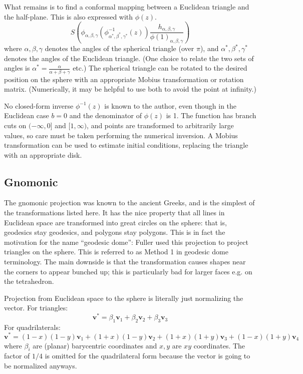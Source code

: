 \documentclass{amsart}[12pt]
\begin{document}
What remains is to find a conformal mapping between a Euclidean triangle and the
half-plane. This is also expressed with $\phi(z)$.
\begin{equation}
  S\left(\phi_{\alpha,\beta,\gamma}
  \left(\phi_{\alpha^*,\beta^*,\gamma^*}^{-1}(z)\right)
  \frac{h_{\alpha,\beta,\gamma}}{\phi(1)_{\alpha,\beta,\gamma}}\right)
\end{equation}
where $\alpha,\beta,\gamma$ denotes the angles of the spherical triangle (over
$\pi$), and $\alpha^*, \beta^*, \gamma^*$ denotes the angles of the Euclidean
triangle. (One choice to relate the two sets of angles is $\alpha^* =
\frac{\alpha}{\alpha+\beta+\gamma}$ etc.) The spherical triangle can be
rotated to the desired position on the sphere with an appropriate Mobius
transformation or rotation matrix. (Numerically, it may be helpful to use
both to avoid the point at infinity.)

No closed-form inverse $\phi^{-1}(z)$ is known to the author, even though in the
Euclidean case $b=0$ and the denominator of $\phi(z)$ is 1. The function has
branch cuts on $(-\infty,0]$ and $[1, \infty)$, and points are transformed to
arbitrarily large values, so care must be taken performing the numerical
inversion. A Mobius transformation can be used to estimate initial conditions,
replacing the triangle with an appropriate disk.

\subsection{Gnomonic}
The gnomonic projection was known to the ancient Greeks, and is the simplest
of the transformations listed here. It has the nice property that all lines in
Euclidean space are transformed into great circles on the sphere: that is,
geodesics stay geodesics, and polygons stay polygons. This is in fact the
motivation for the name ``geodesic dome'': Fuller used this projection to project
triangles on the sphere. This is referred to as Method 1 in geodesic dome
terminology. The main downside is that the transformation causes shapes
near the corners to appear bunched up;
this is particularly bad for larger faces e.g. on the tetrahedron.

Projection from Euclidean
space to the sphere is literally just normalizing the vector. For triangles:
\begin{equation}
   \mathbf v^* =
   \beta_1 \mathbf v_1 + \beta_2 \mathbf v_2 + \beta_3 \mathbf v_3
\end{equation}
For quadrilaterals:
\begin{equation}
   \mathbf v^* = (1-x)(1-y) \mathbf v_1 +
   (1+x)(1-y) \mathbf v_2 +
   (1+x)(1+y) \mathbf v_3 +
   (1-x)(1+y) \mathbf v_4
 \end{equation}
where $\beta_i$ are (planar) barycentric coordinates and $x,y$ are
$xy$ coordinates. The factor of $1/4$ is omitted for the quadrilateral
form because the vector is going to be normalized anyways.
\end{document}
